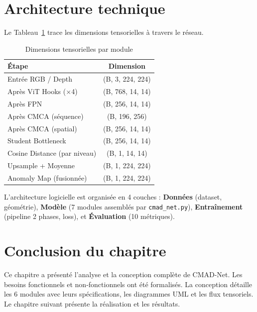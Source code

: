 \documentclass[12pt,a4paper,oneside]{report}
\begin{document}
\section{Architecture technique}

Le Tableau~\ref{tab:dimensions} trace les dimensions tensorielles à travers le réseau.

\begin{table}[H]
\centering
\caption{Dimensions tensorielles par module}
\label{tab:dimensions}
\begin{tabularx}{\textwidth}{X c}
\toprule
\textbf{Étape} & \textbf{Dimension} \\
\midrule
\rowcolor{tableheader} Entrée RGB / Depth & (B, 3, 224, 224) \\
Après ViT Hooks ($\times$4) & (B, 768, 14, 14) \\
\rowcolor{tableheader} Après FPN & (B, 256, 14, 14) \\
Après CMCA (séquence) & (B, 196, 256) \\
\rowcolor{tableheader} Après CMCA (spatial) & (B, 256, 14, 14) \\
Student Bottleneck & (B, 256, 14, 14) \\
\rowcolor{tableheader} Cosine Distance (par niveau) & (B, 1, 14, 14) \\
Upsample + Moyenne & (B, 1, 224, 224) \\
\rowcolor{tableheader} Anomaly Map (fusionnée) & (B, 1, 224, 224) \\
\bottomrule
\end{tabularx}
\end{table}

L'architecture logicielle est organisée en 4 couches : \textbf{Données} (dataset, géométrie), \textbf{Modèle} (7 modules assemblés par \texttt{cmad\_net.py}), \textbf{Entraînement} (pipeline 2 phases, loss), et \textbf{Évaluation} (10 métriques).

\section*{Conclusion du chapitre}

Ce chapitre a présenté l'analyse et la conception complète de CMAD-Net. Les besoins fonctionnels et non-fonctionnels ont été formalisés. La conception détaille les 6 modules avec leurs spécifications, les diagrammes UML et les flux tensoriels. Le chapitre suivant présente la réalisation et les résultats.
\end{document}
